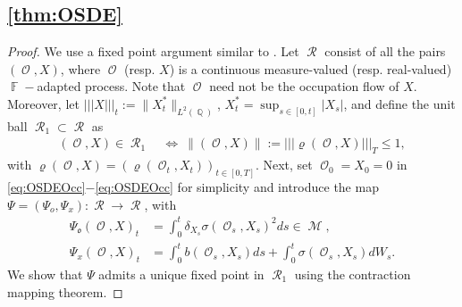 \documentclass[11pt]{article}
\newcommand{\vertiii}[1]{{| \! | \! | #1 | \!
    | \! |}}
\def\mo{\mathfrak{o}}
\theoremstyle{plain}
\theoremstyle{definition}
\DeclareMathOperator{\F}{\mathbb{F}}
\DeclareMathOperator{\Q}{\mathbb{Q}}
\DeclareMathOperator{\calM}{\mathcal{M}}
\DeclareMathOperator{\calO}{\mathcal{O}}
\DeclareMathOperator{\calR}{\mathcal{R}}
\begin{document}
 \subsection{\cref{thm:OSDE}}\label{app:OSDE}
\begin{proof}
     We use a fixed point argument similar to  \cite[Chapter IX]{RevuzYor}. 
Let $\calR$ consist  of all the pairs $(\calO,X)$, where 
$\calO$ (resp. $X$) is a continuous  measure-valued (resp. real-valued) $\F-$adapted process. Note that $\calO$ need not be the occupation flow of $X$. Moreover,  
let  $\vertiii{X}_{t} := \lVert X^*_t\rVert_{L^2(\Q)}$, $X^*_t = \sup_{s\in [0,t]}|X_s|$,   
and define the unit ball  $\calR_1\subset \calR$ as 
\begin{align}
     (\calO,X)\in \calR_1 \ &\Longleftrightarrow \ \lVert(\calO,X)\rVert :=  \vertiii{\varrho(\calO,X)}_{T}\le 1,\label{eq:OSDESup} 
\end{align} 
with  $\varrho(\calO,X) = (\varrho(\calO_t,X_t))_{t\in [0,T]}$. 
Next, set $\calO_0=X_0=0$ in \eqref{eq:OSDEOcc}$-$\eqref{eq:OSDEOcc}  for simplicity  
and 
introduce the map $\Psi = (\Psi_o,\Psi_x):\calR\to \calR$, with  
\begin{align*}
    \Psi_\mo(\calO, X)_t &=   \int_0^t \delta_{X_s}\sigma(\calO_s,X_s)^2ds \in \calM, \\[0.5em]
        \Psi_x(\calO, X)_t &=  \int_0^t b(\calO_s,X_s)ds +  \int_0^t \sigma(\calO_s,X_s)dW_s.
\end{align*}
We show that $\Psi$ admits a unique fixed point  in $\calR_1$ using the contraction mapping theorem. %


\end{proof}
\end{document}
